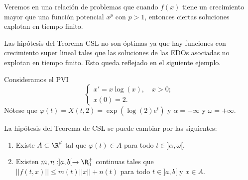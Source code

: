 \documentclass{article}
\begin{document}
\begin{remark}
  Veremos en una relación de problemas que cuando $f(x)$ tiene un crecimiento mayor que una función
  potencial $x^p$ con $p > 1$, entonces ciertas soluciones explotan en tiempo finito.
\end{remark}

Las hipótesis del Teorema CSL no son óptimas ya que hay funciones con crecimiento super lineal tales
que las soluciones de las EDOs asociadas no explotan en tiempo finito. Esto queda reflejado en el
siguiente ejemplo.

\begin{ex}
  Consideramos el PVI
  \[
    \begin{cases}
      x' = x \log(x), \quad x > 0; \\
      x(0) = 2.
    \end{cases}
  \]
  Nótese que $\varphi(t) = X(t, 2) = \exp(\log(2) e^t)$ y $\alpha = -\infty$ y $\omega = +\infty$.
\end{ex}

\begin{remark}
  La hipótesis del Teorema de CSL se puede cambiar por las siguientes:
  
\begin{enumerate}
\item Existe $A \subset \R^d$ tal que $\varphi(t) \in A$ para todo $t \in ]\alpha, \omega[$.
\item Existen $m, n: ]a,b[ \to \R_0^+$ continuas tales que $||f(t,x)|| \le m(t) ||x|| + n(t)$ para todo $t \in ]a,b[$ y $x \in A$.
\end{enumerate}
\end{remark}
\end{document}
